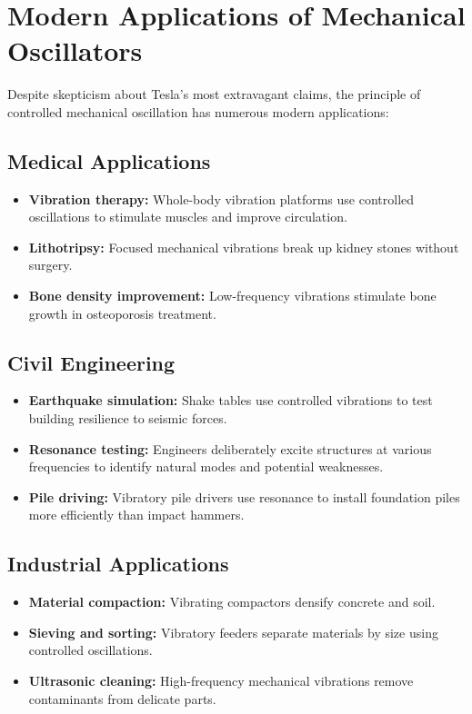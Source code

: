 \documentclass[12pt,a4paper]{article}
\begin{document}
\section*{Modern Applications of Mechanical Oscillators}

Despite skepticism about Tesla's most extravagant claims, the principle of controlled mechanical oscillation has numerous modern applications:

\subsection*{Medical Applications}
\begin{itemize}
\item \textbf{Vibration therapy:} Whole-body vibration platforms use controlled oscillations to stimulate muscles and improve circulation.
\item \textbf{Lithotripsy:} Focused mechanical vibrations break up kidney stones without surgery.
\item \textbf{Bone density improvement:} Low-frequency vibrations stimulate bone growth in osteoporosis treatment.
\end{itemize}

\subsection*{Civil Engineering}
\begin{itemize}
\item \textbf{Earthquake simulation:} Shake tables use controlled vibrations to test building resilience to seismic forces.
\item \textbf{Resonance testing:} Engineers deliberately excite structures at various frequencies to identify natural modes and potential weaknesses.
\item \textbf{Pile driving:} Vibratory pile drivers use resonance to install foundation piles more efficiently than impact hammers.
\end{itemize}

\subsection*{Industrial Applications}
\begin{itemize}
\item \textbf{Material compaction:} Vibrating compactors densify concrete and soil.
\item \textbf{Sieving and sorting:} Vibratory feeders separate materials by size using controlled oscillations.
\item \textbf{Ultrasonic cleaning:} High-frequency mechanical vibrations remove contaminants from delicate parts.
\end{itemize}
\end{document}

